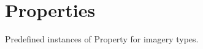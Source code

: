 \hypertarget{group___imagery_properties}{}\section{Properties}
\label{group___imagery_properties}
Predefined instances of Property for imagery types. 

